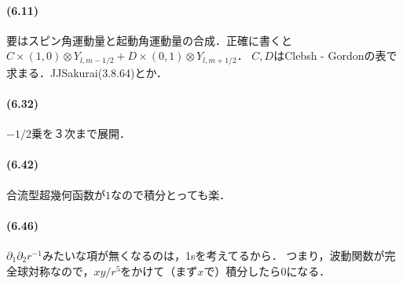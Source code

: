 \paragraph{(6.11)}
要はスピン角運動量と起動角運動量の合成．正確に書くと$C\times(1, 0)\otimes Y_{l, m - 1/2} + D\times(0, 1)\otimes Y_{l, m + 1/2}$．
$C, D$はClebsh - Gordonの表で求まる．JJSakurai(3.8.64)とか．

\paragraph{(6.32)}
$ - 1/2$乗を３次まで展開．


\paragraph{(6.42)}
合流型超幾何函数が$1$なので積分とっても楽．

\paragraph{(6.46)}
$\partial_1\partial_2 r^{ - 1}$みたいな項が無くなるのは，1sを考えてるから．
つまり，波動関数が完全球対称なので，$xy/r^5$をかけて（まず$x$で）積分したら$0$になる．

